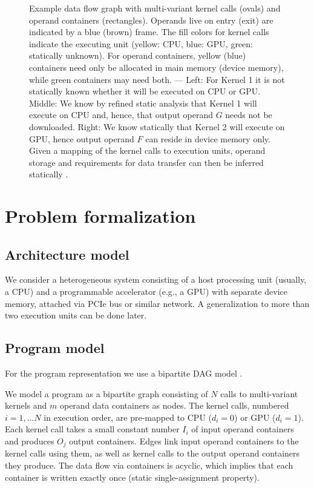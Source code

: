 \documentclass{article}
\begin{document}
\begin{figure}
    \caption{Example data flow graph with multi-variant kernel calls (ovals) and operand containers (rectangles). Operands live on entry (exit) are indicated by a blue (brown) frame. The fill colors for kernel calls indicate the executing unit (yellow: CPU, blue: GPU, green: statically unknown). For operand containers, yellow (blue) containers need only be allocated in main memory (device memory), while green containers may need both. --- Left: For Kernel 1 it is not statically known whether it will be executed on CPU or GPU. Middle: We know by refined static analysis that Kernel 1 will execute on CPU and, hence, that output operand $G$ needs not be downloaded. Right: We know statically that Kernel 2
    will execute on GPU, hence output operand $F$ can reside in device memory only. Given a mapping of the kernel calls to execution units, operand storage and requirements for data transfer can then be inferred statically \cite{Kessler:SCOPES19}.}
    \label{fig:DAG}
\end{figure}


\section{Problem formalization}

\subsection{Architecture model}

We consider a heterogeneous system consisting of
a host processing unit (usually, a CPU) and 
a programmable accelerator (e.g., a GPU) with separate device memory,
attached via PCIe bus or similar network.
A generalization to more than two execution
units can be done later.

\subsection{Program model}

For the program representation 
we use a bipartite DAG model \cite{Kessler:SCOPES19}.

We model a program as a bipartite
graph consisting of $N$ calls to multi-variant 
kernels and $m$ operand data containers as nodes.
The kernel calls, 
numbered $i=1,...N$ in execution order,
are pre-mapped to CPU ($d_i=0$) or GPU ($d_i=1$).
Each kernel call takes a small constant number
$I_i$ of input operand containers and produces
$O_j$ output containers. Edges link input operand
containers to the kernel calls using them, 
as well as kernel calls to the output operand
containers they produce. The data flow via
containers is acyclic, which implies that each
container is written exactly once 
(static single-assignment property). 
\end{document}
